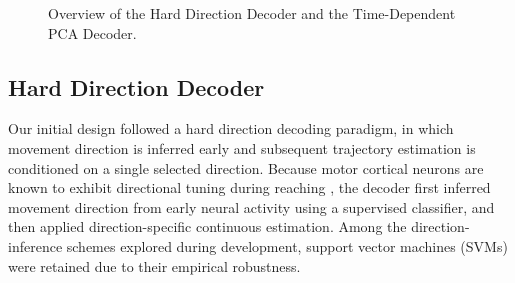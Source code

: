 \begin{figure}[t]
\caption{Overview of the Hard Direction Decoder and the Time-Dependent PCA Decoder.}
\label{fig:pipeline}
\end{figure}

\subsection{Hard Direction Decoder}

Our initial design followed a hard direction decoding paradigm, in which movement direction is inferred early and subsequent trajectory estimation is conditioned on a single selected direction. Because motor cortical neurons are known to exhibit directional tuning during reaching \cite{b3}, the decoder first inferred movement direction from early neural activity using a supervised classifier, and then applied direction-specific continuous estimation. Among the direction-inference schemes explored during development, support vector machines (SVMs) were retained due to their empirical robustness.

